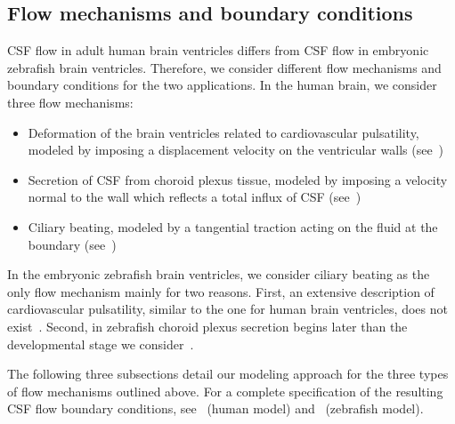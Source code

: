 \documentclass{template}
\begin{document}
\subsection{Flow mechanisms and boundary conditions}
CSF flow in adult human brain ventricles differs from CSF flow in embryonic
zebrafish brain ventricles. Therefore, we consider different flow mechanisms
and boundary conditions for the two applications.
In the human brain, we consider three flow mechanisms:
\begin{itemize}
    \item Deformation of the brain ventricles related to cardiovascular pulsatility,
    modeled by imposing a displacement velocity
    on the ventricular walls (see~)
    \item Secretion of CSF from choroid plexus tissue,
    modeled by imposing a velocity normal to the wall
    which reflects a total influx of CSF (see~)
    \item Ciliary beating, modeled by a tangential traction
    acting on the fluid at the boundary (see~)
\end{itemize}

In the embryonic zebrafish brain ventricles, we consider ciliary beating as
the only flow mechanism mainly for two reasons. First, an extensive description
of cardiovascular pulsatility, similar to the one for human brain ventricles,
does not exist~\cite{Herlyng2025AdvectionDiffusion}.
Second, in zebrafish choroid plexus secretion begins later than 
the developmental stage we consider~\cite{bill2008development}. 

The following three subsections detail our modeling approach for the three
types of flow mechanisms outlined above. For a complete specification of
the resulting CSF flow boundary conditions, see~ (human model)
and~ (zebrafish model).
\end{document}
